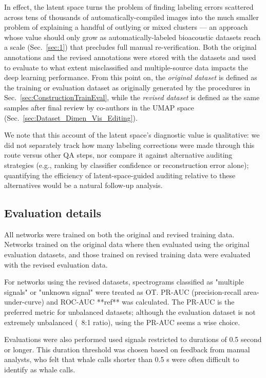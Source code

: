 \documentclass[preprint,NumberedRefs]{JASAnew}
\begin{document}
In effect, the latent space turns the problem of finding labeling errors
scattered across tens of thousands of automatically-compiled images into
the much smaller problem of explaining a handful of outlying or mixed
clusters --- an approach whose value should only grow as
automatically-labeled bioacoustic datasets reach a scale (Sec.~\ref{sec:1})
that precludes full manual re-verification. Both the original annotations
and the revised annotations were stored with the datasets and used to
evaluate to what extent misclassified and multiple-source data impacts the
deep learning performance. From this point on, the \emph{original dataset}
is defined as the training or evaluation dataset as originally generated by
the procedures in Sec.~\ref{sec:ConstructionTrainEval}, while the
\emph{revised dataset} is defined as the same samples after final review by
co-authors in the UMAP space (Sec.~\ref{sec:Dataset_Dimen_Vis_Editing}).

We note that this account of the latent space's diagnostic value is
qualitative: we did not separately track how many labeling corrections were
made through this route versus other QA steps, nor compare it against
alternative auditing strategies (e.g., ranking by classifier confidence or
reconstruction error alone); quantifying the efficiency of
latent-space-guided auditing relative to these alternatives would be a
natural follow-up analysis.

\subsection{Evaluation details}

All networks were trained on both the original and revised training data.  Networks trained on the original data where then evaluated using the original evaluation datasets, and those trained on revised training data were evaluated with the revised evaluation data.

For networks using the revised datasets, spectrograms classified as "multiple signals" or "unknown signal" were treated as OT.  PR-AUC (precision-recall area-under-curve) and ROC-AUC **ref** was calculated.  The PR-AUC is the preferred metric for unbalanced datasets; although the evaluation dataset is not extremely unbalanced (~8:1 ratio), using the PR-AUC seems a wise choice.

Evaluations were also performed used signals restricted to durations of 0.5 second or longer.  This duration threshold was chosen based on feedback from manual analysts, who felt that whale calls shorter than 0.5 s were often difficult to identify as whale calls.
\end{document}
